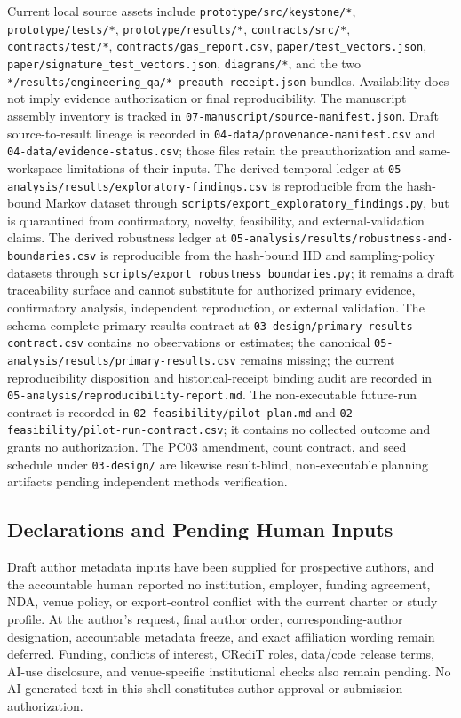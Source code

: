 \documentclass[
]{article}
\begin{document}
Current local source assets include \texttt{prototype/src/keystone/*},
\texttt{prototype/tests/*}, \texttt{prototype/results/*},
\texttt{contracts/src/*}, \texttt{contracts/test/*},
\texttt{contracts/gas\_report.csv}, \texttt{paper/test\_vectors.json},
\texttt{paper/signature\_test\_vectors.json}, \texttt{diagrams/*}, and
the two \texttt{*/results/engineering\_qa/*-preauth-receipt.json}
bundles. Availability does not imply evidence authorization or final
reproducibility. The manuscript assembly inventory is tracked in
\texttt{07-manuscript/source-manifest.json}. Draft source-to-result
lineage is recorded in \texttt{04-data/provenance-manifest.csv} and
\texttt{04-data/evidence-status.csv}; those files retain the
preauthorization and same-workspace limitations of their inputs. The
derived temporal ledger at
\texttt{05-analysis/results/exploratory-findings.csv} is reproducible
from the hash-bound Markov dataset through
\texttt{scripts/export\_exploratory\_findings.py}, but is quarantined
from confirmatory, novelty, feasibility, and external-validation claims.
The derived robustness ledger at
\texttt{05-analysis/results/robustness-and-boundaries.csv} is
reproducible from the hash-bound IID and sampling-policy datasets
through \texttt{scripts/export\_robustness\_boundaries.py}; it remains a
draft traceability surface and cannot substitute for authorized primary
evidence, confirmatory analysis, independent reproduction, or external
validation. The schema-complete primary-results contract at
\texttt{03-design/primary-results-contract.csv} contains no observations
or estimates; the canonical
\texttt{05-analysis/results/primary-results.csv} remains missing; the
current reproducibility disposition and historical-receipt binding audit
are recorded in \texttt{05-analysis/reproducibility-report.md}. The
non-executable future-run contract is recorded in
\texttt{02-feasibility/pilot-plan.md} and
\texttt{02-feasibility/pilot-run-contract.csv}; it contains no collected
outcome and grants no authorization. The PC03 amendment, count contract,
and seed schedule under \texttt{03-design/} are likewise result-blind,
non-executable planning artifacts pending independent methods
verification.

\subsection{Declarations and Pending Human
Inputs}\label{declarations-and-pending-human-inputs}

Draft author metadata inputs have been supplied for prospective authors,
and the accountable human reported no institution, employer, funding
agreement, NDA, venue policy, or export-control conflict with the
current charter or study profile. At the author's request, final author
order, corresponding-author designation, accountable metadata freeze,
and exact affiliation wording remain deferred. Funding, conflicts of
interest, CRediT roles, data/code release terms, AI-use disclosure, and
venue-specific institutional checks also remain pending. No AI-generated
text in this shell constitutes author approval or submission
authorization.
\end{document}

